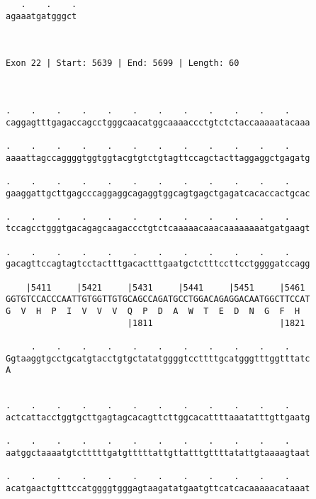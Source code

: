 \documentclass{article}
\begin{document}
\begin{Verbatim}
   .    .    .
agaaatgatgggct
              
              
 
Exon 22 | Start: 5639 | End: 5699 | Length: 60



.    .    .    .    .    .    .    .    .    .    .    .    
caggagtttgagaccagcctgggcaacatggcaaaaccctgtctctaccaaaaatacaaa
                                                            
.    .    .    .    .    .    .    .    .    .    .    .    
aaaattagccaggggtggtggtacgtgtctgtagttccagctacttaggaggctgagatg
                                                            
.    .    .    .    .    .    .    .    .    .    .    .    
gaaggattgcttgagcccaggaggcagaggtggcagtgagctgagatcacaccactgcac
                                                            
.    .    .    .    .    .    .    .    .    .    .    .    
tccagcctgggtgacagagcaagaccctgtctcaaaaacaaacaaaaaaaatgatgaagt
                                                            
.    .    .    .    .    .    .    .    .    .    .    .    
gacagttccagtagtcctactttgacactttgaatgctctttccttcctggggatccagg
                                                            
    |5411     |5421     |5431     |5441     |5451     |5461 
GGTGTCCACCCAATTGTGGTTGTGCAGCCAGATGCCTGGACAGAGGACAATGGCTTCCAT
G  V  H  P  I  V  V  V  Q  P  D  A  W  T  E  D  N  G  F  H  
                        |1811                         |1821 
  
     .    .    .    .    .    .    .    .    .    .    .    
Ggtaaggtgcctgcatgtacctgtgctatatggggtccttttgcatgggtttggtttatc
A                                                           
                                                            
  
.    .    .    .    .    .    .    .    .    .    .    .    
actcattacctggtgcttgagtagcacagttcttggcacattttaaatatttgttgaatg
                                                            
.    .    .    .    .    .    .    .    .    .    .    .    
aatggctaaaatgtctttttgatgtttttattgttatttgttttatattgtaaaagtaat
                                                            
.    .    .    .    .    .    .    .    .    .    .    .    
acatgaactgtttccatggggtgggagtaagatatgaatgttcatcacaaaaacataaat
                                                            

\end{Verbatim}
\end{document}
